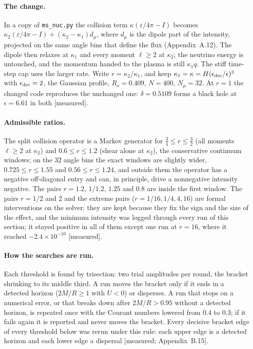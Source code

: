 \documentclass[11pt]{article}
\newcommand{\grade}[1]{\textsf{\small[#1]}}
\begin{document}
\paragraph{The change.} In a copy of \texttt{ms\_nuc.py} the collision term $\kappa(\varepsilon/4\pi-I)$ becomes $\kappa_2(\varepsilon/4\pi-I)+(\kappa_2-\kappa_1)d_\mu$, where $d_\mu$ is the dipole part of the intensity, projected on the same angle bins that define the flux (Appendix~A.12). The dipole then relaxes at $\kappa_1$ and every moment $\ell\ge2$ at $\kappa_2$; the neutrino energy is untouched, and the momentum handed to the plasma is still $\kappa_1q$. The stiff time-step cap uses the larger rate. Write $r=\kappa_2/\kappa_1$, and keep $\kappa_1=\kappa=H(\epsilon_{\rm dec}/\epsilon)^3$ with $\epsilon_{\rm dec}=2$, the Gaussian profile, $R_\nu=0.409$, $N=400$, $N_\mu=32$. At $r=1$ the changed code reproduces the unchanged one: $\delta=0.5109$ forms a black hole at $\epsilon=6.61$ in both \grade{measured}.

\paragraph{Admissible ratios.} The split collision operator is a Markov generator for $\tfrac34\le r\le\tfrac32$ (all moments $\ell\ge2$ at $\kappa_2$) and $0.6\le r\le1.2$ (shear alone at $\kappa_2$), the conservative continuum windows; on the $32$ angle bins the exact windows are slightly wider, $0.725\le r\le1.55$ and $0.56\le r\le1.24$, and outside them the operator has a negative off-diagonal entry and can, in principle, drive a nonnegative intensity negative. The pairs $r=1.2$, $1/1.2$, $1.25$ and $0.8$ are inside the first window. The pairs $r=1/2$ and $2$ and the extreme pairs ($r=1/16,1/4,4,16$) are formal interventions on the solver: they are kept because they fix the sign and the size of the effect, and the minimum intensity was logged through every run of this section; it stayed positive in all of them except one run at $r=16$, where it reached $-2.4\times10^{-10}$ \grade{measured}.

\paragraph{How the searches are run.} Each threshold is found by trisection: two trial amplitudes per round, the bracket shrinking to its middle third. A run moves the bracket only if it ends in a detected horizon ($2M/R\ge1$ with $U<0$) or disperses. A run that stops on a numerical error, or that breaks down after $2M/R>0.95$ without a detected horizon, is repeated once with the Courant numbers lowered from $0.4$ to $0.3$; if it fails again it is reported and never moves the bracket. Every decisive bracket edge of every threshold below was rerun under this rule: each upper edge is a detected horizon and each lower edge a dispersal \grade{measured; Appendix~B.15}.
\end{document}

